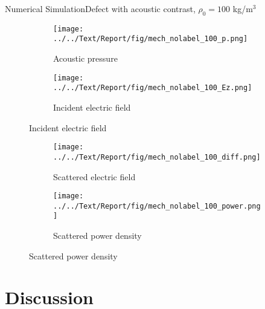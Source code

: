 \documentclass[11pt, final]{beamer}
\begin{document}
	\begin{frame}{Numerical Simulation}{Defect with acoustic contrast, $\rho_0 = 100$ kg/m$^3$}
		\begin{figure}
			\centering
			\begin{subfigure}[t]{0.5\textheight}
				\vspace{-1cm}
				\caption*{\hspace{0.5cm}Acoustic pressure}
				\vspace{-0.2cm}
				\texttt{[image: ../../Text/Report/fig/mech\_nolabel\_100\_p.png]}
			\end{subfigure}
			\begin{subfigure}[t]{0.5\textheight}
				\vspace{-1cm}
				\caption*{\hspace{0.5cm}Incident electric field}
				\vspace{-0.2cm}
				\texttt{[image: ../../Text/Report/fig/mech\_nolabel\_100\_Ez.png]}
			\end{subfigure}
		\end{figure}
		
		\begin{figure}
			\centering
			\vspace{-0.4cm}
			\begin{subfigure}[t]{0.5\textheight}
				\texttt{[image: ../../Text/Report/fig/mech\_nolabel\_100\_diff.png]}
				\vspace{-0.1cm}
				\caption*{\hspace{0.5cm}Scattered electric field}
			\end{subfigure}
			\begin{subfigure}[t]{0.5\textheight}
				\texttt{[image: ../../Text/Report/fig/mech\_nolabel\_100\_power.png]}
				\vspace{-0.1cm}
				\caption*{\hspace{0.5cm}Scattered power density}
			\end{subfigure}
		\end{figure}
	\end{frame}
	
	\section{Discussion}
	
\end{document}
